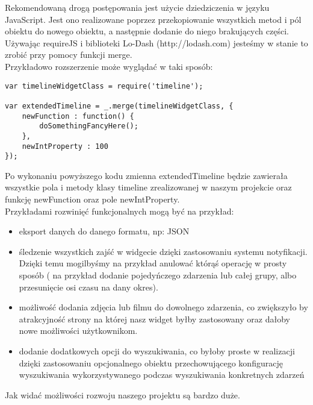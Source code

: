 \documentclass[polish,12pt]{aghthesis}
\begin{document}
Rekomendowaną drogą postępowania jest użycie dziedziczenia w języku JavaScript.
Jest ono realizowane poprzez przekopiowanie wszystkich metod i pól obiektu do nowego obiektu, a następnie dodanie do niego brakujących części. Używając requireJS i biblioteki Lo-Dash (http://lodash.com) jesteśmy w stanie to zrobić przy pomocy funkcji merge. \\

Przykładowo rozszerzenie może wyglądać w taki sposób:

\begin{lstlisting}
var timelineWidgetClass = require('timeline');

var extendedTimeline = _.merge(timelineWidgetClass, {
	newFunction : function() {
		doSomethingFancyHere();
	},
	newIntProperty : 100
});
\end{lstlisting}


Po wykonaniu powyższego kodu zmienna extendedTimeline będzie zawierała wszystkie pola i metody klasy timeline zrealizowanej w naszym projekcie oraz funkcję newFunction oraz pole newIntProperty.\\

Przykładami rozwinięć funkcjonalnych mogą być na przykład:
\begin{itemize}
	\item eksport danych do danego formatu, np: JSON
	\item śledzenie wszystkich zajść w widgecie dzięki zastosowaniu systemu notyfikacji. Dzięki temu mogilbyśmy na przykład anulować którąś operację w prosty sposób ( na przykład dodanie pojedyńczego zdarzenia lub całej grupy, albo przesunięcie osi czasu na dany okres).
	\item możliwość dodania zdjęcia lub filmu do dowolnego zdarzenia, co zwiększyło by atrakcyjność strony na której nasz widget byłby zastosowany oraz dałoby nowe możliwości użytkownikom.
	\item dodanie dodatkowych opcji do wyszukiwania, co byłoby proste w realizacji dzięki zastosowaniu opcjonalnego obiektu przechowującego konfigurację wyszukiwania wykorzystywanego podczas wyszukiwania konkretnych zdarzeń
\end{itemize}

Jak widać możliwości rozwoju naszego projektu są bardzo duże.




\nocite{artykul2011,ksiazka2011,narzedzie2011,projekt2011}


\end{document}
